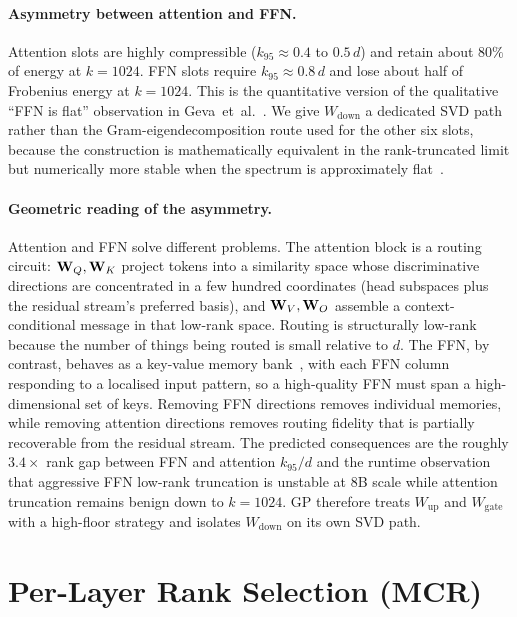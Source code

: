 \documentclass[11pt]{article}
\begin{document}
\paragraph{Asymmetry between attention and FFN.}
Attention slots are highly compressible ($k_{95}\approx 0.4$ to $0.5\,d$)
and retain about $80\%$ of energy at $k{=}1024$. FFN slots require
$k_{95}\approx 0.8\,d$ and lose about half of Frobenius energy at
$k{=}1024$. This is the quantitative version of the qualitative
``FFN is flat'' observation in Geva~et~al.~\cite{geva2021ffn}. We give
$W_\text{down}$ a dedicated SVD path rather than the
Gram-eigendecomposition route used for the other six slots, because
the construction is mathematically equivalent in the rank-truncated
limit but numerically more stable when the spectrum is approximately
flat~\cite{golub2013matrix,eckart1936}.

\paragraph{Geometric reading of the asymmetry.}
Attention and FFN solve different problems. The attention block is a
routing circuit: $\mathbf{W}_Q,\mathbf{W}_K$ project tokens into a similarity
space whose discriminative directions are concentrated in a few hundred
coordinates (head subspaces plus the residual stream's preferred basis),
and $\mathbf{W}_V,\mathbf{W}_O$ assemble a context-conditional message in that
low-rank space. Routing is structurally low-rank because the number of
things being routed is small relative to $d$. The FFN, by contrast,
behaves as a key-value memory bank~\cite{geva2021ffn}, with each FFN
column responding to a localised input pattern, so a high-quality FFN
must span a high-dimensional set of keys. Removing FFN directions removes
individual memories, while removing attention directions removes routing
fidelity that is partially recoverable from the residual stream. The
predicted consequences are the roughly $3.4\times$ rank gap between
FFN and attention $k_{95}/d$ and the runtime observation that aggressive
FFN low-rank truncation is unstable at 8B scale while attention
truncation remains benign down to $k{=}1024$. GP therefore treats
$W_\text{up}$ and $W_\text{gate}$ with a high-floor strategy and isolates
$W_\text{down}$ on its own SVD path.

\section{Per-Layer Rank Selection (MCR)}
\label{sec:mcr}
\end{document}
